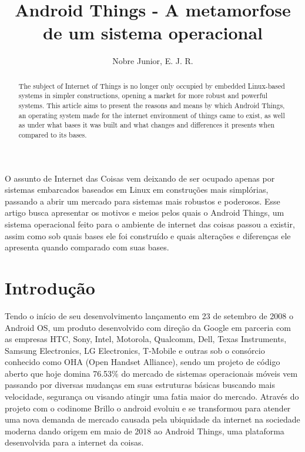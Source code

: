 \documentclass[12pt]{article}
\title{Android Things - A metamorfose de um sistema operacional}
\author{Nobre Junior, E. J. R.\inst{1}}
\begin{document}
 

\maketitle

\begin{abstract}
	The subject of Internet of Things is no longer only occupied by embedded Linux-based systems in simpler constructions, opening a market for more robust and powerful systems. This article aims to present the reasons and means by which Android Things, an operating system made for the internet environment of things came to exist, as well as under what bases it was built and what changes and differences it presents when compared to its bases.
\end{abstract}
     
\begin{resumo} 
	O assunto de Internet das Coisas vem deixando de ser ocupado apenas por sistemas embarcados baseados em Linux em construções mais simplórias, passando a abrir um mercado para sistemas mais robustos e poderosos. Esse artigo busca apresentar os motivos e meios pelos quais o Android Things, um sistema operacional feito para o ambiente de internet das coisas passou a existir, assim como sob quais bases ele foi construído e quais alterações e diferenças ele apresenta quando comparado com suas bases.
\end{resumo}


\section{Introdução}
Tendo o início de seu desenvolvimento lançamento em 23  de setembro de 2008 o Android OS, um produto desenvolvido com direção da Google em parceria com as empresas HTC, Sony, Intel, Motorola, Qualcomm, Dell, Texas Instruments, Samsung Electronics, LG Electronics, T-Mobile e outras sob o consórcio conhecido como OHA (Open Handset Alliance), sendo um projeto de código aberto que hoje domina 76.53\% do mercado de sistemas operacionais móveis \cite{statcounter}
vem passando por diversas mudanças em suas estruturas básicas buscando mais velocidade, segurança ou visando atingir uma fatia maior do mercado. Através do projeto com o codinome Brillo o android evoluiu e se transformou para atender uma nova demanda de mercado causada pela ubiquidade da internet na sociedade moderna dando origem em maio de 2018 ao Android Things, uma plataforma desenvolvida para a internet da coisas.
\end{document}
